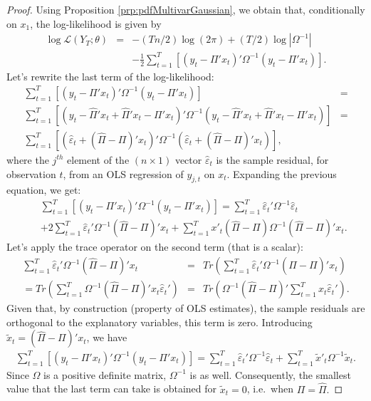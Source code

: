 \documentclass[
  12pt,
]{book}
\theoremstyle{definition}
\theoremstyle{definition}
\theoremstyle{definition}
\theoremstyle{definition}
\theoremstyle{remark}
\begin{document}
\begin{proof}
Using Proposition \ref{prp:pdfMultivarGaussian}, we obtain that, conditionally on \(x_1\), the log-likelihood is given by
\begin{eqnarray*}
\log\mathcal{L}(Y_{T};\theta) & = & -(Tn/2)\log(2\pi)+(T/2)\log\left|\Omega^{-1}\right|\\
&  & -\frac{1}{2}\sum_{t=1}^{T}\left[\left(y_{t}-\Pi'x_{t}\right)'\Omega^{-1}\left(y_{t}-\Pi'x_{t}\right)\right].
\end{eqnarray*}
Let's rewrite the last term of the log-likelihood:
\begin{eqnarray*}
\sum_{t=1}^{T}\left[\left(y_{t}-\Pi'x_{t}\right)'\Omega^{-1}\left(y_{t}-\Pi'x_{t}\right)\right] & =\\
\sum_{t=1}^{T}\left[\left(y_{t}-\hat{\Pi}'x_{t}+\hat{\Pi}'x_{t}-\Pi'x_{t}\right)'\Omega^{-1}\left(y_{t}-\hat{\Pi}'x_{t}+\hat{\Pi}'x_{t}-\Pi'x_{t}\right)\right] & =\\
\sum_{t=1}^{T}\left[\left(\hat{\varepsilon}_{t}+(\hat{\Pi}-\Pi)'x_{t}\right)'\Omega^{-1}\left(\hat{\varepsilon}_{t}+(\hat{\Pi}-\Pi)'x_{t}\right)\right],
\end{eqnarray*}
where the \(j^{th}\) element of the \((n\times1)\) vector \(\hat{\varepsilon}_{t}\) is the sample residual, for observation \(t\), from an OLS regression of \(y_{j,t}\) on \(x_{t}\). Expanding the previous equation, we get:
\begin{eqnarray*}
&&\sum_{t=1}^{T}\left[\left(y_{t}-\Pi'x_{t}\right)'\Omega^{-1}\left(y_{t}-\Pi'x_{t}\right)\right]  = \sum_{t=1}^{T}\hat{\varepsilon}_{t}'\Omega^{-1}\hat{\varepsilon}_{t}\\
&&+2\sum_{t=1}^{T}\hat{\varepsilon}_{t}'\Omega^{-1}(\hat{\Pi}-\Pi)'x_{t}+\sum_{t=1}^{T}x'_{t}(\hat{\Pi}-\Pi)\Omega^{-1}(\hat{\Pi}-\Pi)'x_{t}.
\end{eqnarray*}
Let's apply the trace operator on the second term (that is a scalar):
\begin{eqnarray*}
\sum_{t=1}^{T}\hat{\varepsilon}_{t}'\Omega^{-1}(\hat{\Pi}-\Pi)'x_{t} & = & Tr\left(\sum_{t=1}^{T}\hat{\varepsilon}_{t}'\Omega^{-1}(\hat{\Pi}-\Pi)'x_{t}\right)\\
=  Tr\left(\sum_{t=1}^{T}\Omega^{-1}(\hat{\Pi}-\Pi)'x_{t}\hat{\varepsilon}_{t}'\right) & = & Tr\left(\Omega^{-1}(\hat{\Pi}-\Pi)'\sum_{t=1}^{T}x_{t}\hat{\varepsilon}_{t}'\right).
\end{eqnarray*}
Given that, by construction (property of OLS estimates), the sample residuals are orthogonal to the explanatory variables, this term is zero. Introducing \(\tilde{x}_{t}=(\hat{\Pi}-\Pi)'x_{t}\), we have
\begin{eqnarray*}
\sum_{t=1}^{T}\left[\left(y_{t}-\Pi'x_{t}\right)'\Omega^{-1}\left(y_{t}-\Pi'x_{t}\right)\right] =\sum_{t=1}^{T}\hat{\varepsilon}_{t}'\Omega^{-1}\hat{\varepsilon}_{t}+\sum_{t=1}^{T}\tilde{x}'_{t}\Omega^{-1}\tilde{x}_{t}.
\end{eqnarray*}
Since \(\Omega\) is a positive definite matrix, \(\Omega^{-1}\) is as well. Consequently, the smallest value that the last term can take is obtained for \(\tilde{x}_{t}=0\), i.e.~when \(\Pi=\hat{\Pi}.\)


\end{proof}
\end{document}
